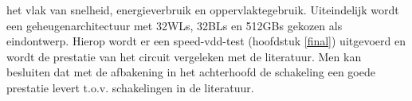 het vlak van snelheid, energieverbruik en oppervlaktegebruik. Uiteindelijk wordt een geheugenarchitectuur met 32WLs, 32BLs en 512GBs gekozen als eindontwerp. Hierop wordt er een speed-vdd-test (hoofdstuk \ref{final}) uitgevoerd en wordt de prestatie van het circuit vergeleken met de literatuur. Men kan besluiten dat met de afbakening in het achterhoofd de schakeling een goede prestatie levert t.o.v. schakelingen in de literatuur.
